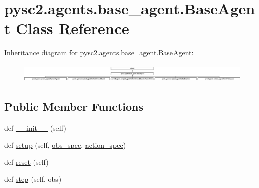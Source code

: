 \hypertarget{classpysc2_1_1agents_1_1base__agent_1_1_base_agent}{}\section{pysc2.\+agents.\+base\+\_\+agent.\+Base\+Agent Class Reference}
\label{classpysc2_1_1agents_1_1base__agent_1_1_base_agent}
Inheritance diagram for pysc2.\+agents.\+base\+\_\+agent.\+Base\+Agent\+:\begin{figure}[H]
\begin{center}
\leavevmode
\includegraphics[height=0.886544cm]{classpysc2_1_1agents_1_1base__agent_1_1_base_agent}
\end{center}
\end{figure}
\subsection*{Public Member Functions}
\begin{DoxyCompactItemize}
\item 
def \mbox{\hyperlink{classpysc2_1_1agents_1_1base__agent_1_1_base_agent_a03935d754145f417240d25e0192c57bc}{\+\_\+\+\_\+init\+\_\+\+\_\+}} (self)
\item 
def \mbox{\hyperlink{classpysc2_1_1agents_1_1base__agent_1_1_base_agent_afba8f06273c8740b105573f1a422ba05}{setup}} (self, \mbox{\hyperlink{classpysc2_1_1agents_1_1base__agent_1_1_base_agent_ad6cefb81724b9d234887cea543c4f06e}{obs\+\_\+spec}}, \mbox{\hyperlink{classpysc2_1_1agents_1_1base__agent_1_1_base_agent_a550b216b98ae40b2da1b2fd9015d3019}{action\+\_\+spec}})
\item 
def \mbox{\hyperlink{classpysc2_1_1agents_1_1base__agent_1_1_base_agent_a9814c84f6f2eefa13b69f45f36afcca4}{reset}} (self)
\item 
def \mbox{\hyperlink{classpysc2_1_1agents_1_1base__agent_1_1_base_agent_a64b82c5e648902378e9485b27be6dc0b}{step}} (self, obs)
\end{DoxyCompactItemize}
